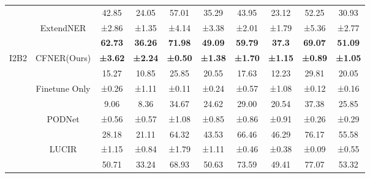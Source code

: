\documentclass[11pt]{article}
\begin{document}
\begin{table*}[!t]
{\begin{tabular}{@{}cccccccccc@{}}
 &  & \cellcolor[HTML]{EFEFEF}42.85 & \cellcolor[HTML]{EFEFEF}24.05 & \cellcolor[HTML]{EFEFEF}57.01 & \cellcolor[HTML]{EFEFEF}35.29 & \cellcolor[HTML]{EFEFEF}43.95 & \cellcolor[HTML]{EFEFEF}23.12 & \cellcolor[HTML]{EFEFEF}52.25 & \cellcolor[HTML]{EFEFEF}30.93 \\
 & \multirow{-2}{*}{ExtendNER} & \cellcolor[HTML]{EFEFEF}±2.86 & \cellcolor[HTML]{EFEFEF}±1.35 & \cellcolor[HTML]{EFEFEF}±4.14 & \cellcolor[HTML]{EFEFEF}±3.38 & \cellcolor[HTML]{EFEFEF}±2.01 & \cellcolor[HTML]{EFEFEF}±1.79 & \cellcolor[HTML]{EFEFEF}±5.36 & \cellcolor[HTML]{EFEFEF}±2.77\\
 &  & \textbf{62.73} & \textbf{36.26} & \textbf{71.98} & \textbf{49.09} & \textbf{59.79} & \textbf{37.3} & \textbf{69.07} & \textbf{51.09} \\
\multirow{-12}{*}{I2B2} & \multirow{-2}{*}{CFNER(Ours)} & \textbf{±3.62} & \textbf{±2.24} & \textbf{±0.50} & \textbf{±1.38} & \textbf{±1.70} & \textbf{±1.15} & \textbf{±0.89} & \textbf{±1.05} \\ \midrule
 &  & \cellcolor[HTML]{EFEFEF}15.27 & \cellcolor[HTML]{EFEFEF}10.85 & \cellcolor[HTML]{EFEFEF}25.85 & \cellcolor[HTML]{EFEFEF}20.55 & \cellcolor[HTML]{EFEFEF}17.63 & \cellcolor[HTML]{EFEFEF}12.23 & \cellcolor[HTML]{EFEFEF}29.81 & \cellcolor[HTML]{EFEFEF}20.05\\
 & \multirow{-2}{*}{Finetune Only} & \cellcolor[HTML]{EFEFEF}±0.26 & \cellcolor[HTML]{EFEFEF}±1.11 & \cellcolor[HTML]{EFEFEF}±0.11 & \cellcolor[HTML]{EFEFEF}±0.24 & \cellcolor[HTML]{EFEFEF}±0.57 & \cellcolor[HTML]{EFEFEF}±1.08 & \cellcolor[HTML]{EFEFEF}±0.12 & \cellcolor[HTML]{EFEFEF}±0.16 \\
 &  & 9.06 & 8.36 & 34.67 & 24.62 & 29.00 & 20.54 & 37.38 & 25.85 \\
 & \multirow{-2}{*}{PODNet} & ±0.56 & ±0.57 & ±1.08 & ±0.85 & ±0.86 & ±0.91 & ±0.26 & ±0.29 \\
 &  & \cellcolor[HTML]{EFEFEF}28.18 & \cellcolor[HTML]{EFEFEF}21.11 & \cellcolor[HTML]{EFEFEF}64.32 & \cellcolor[HTML]{EFEFEF}43.53 & \cellcolor[HTML]{EFEFEF}66.46 & \cellcolor[HTML]{EFEFEF}46.29 & \cellcolor[HTML]{EFEFEF}76.17 & \cellcolor[HTML]{EFEFEF}55.58 \\
 & \multirow{-2}{*}{LUCIR} & \cellcolor[HTML]{EFEFEF}±1.15 & \cellcolor[HTML]{EFEFEF}±0.84 & \cellcolor[HTML]{EFEFEF}±1.79 & \cellcolor[HTML]{EFEFEF}±1.11 & \cellcolor[HTML]{EFEFEF}±0.46 & \cellcolor[HTML]{EFEFEF}±0.38 & \cellcolor[HTML]{EFEFEF}±0.09 & \cellcolor[HTML]{EFEFEF}±0.55\\
 &  & 50.71 & 33.24 & 68.93 & 50.63 & 73.59 & 49.41 & 77.07 & 53.32 \\

\end{tabular}}
\end{table*}
\end{document}
